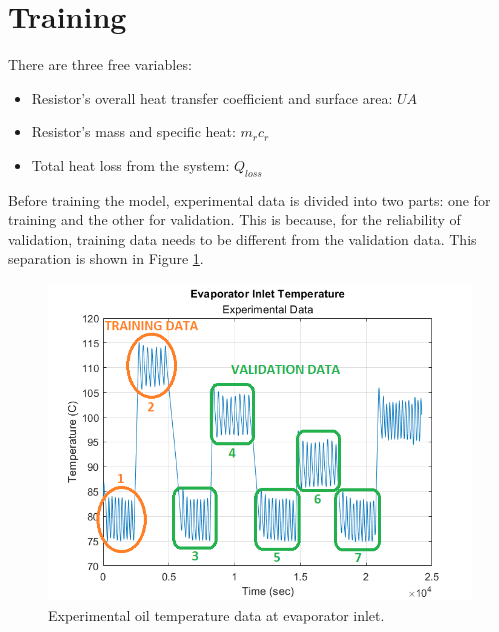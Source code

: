 \section{Training}\label{training}
There are three free variables:
\begin{itemize}
    \item Resistor's overall heat transfer coefficient and surface area: $UA$
    \item Resistor's mass and specific heat: $m_{r}c_{r}$
    \item Total heat loss from the system: $Q_{loss}$
\end{itemize}

Before training the model, experimental data is divided into two parts: one for training and the other for validation. This is because, for the reliability of validation, training data needs to be different from the validation data. This separation is shown in Figure \ref{fig:experimentaldata}.

\begin{figure}[h]
    \centering
    \includegraphics[width=13cm]{images/experimental-data.png}
    \caption{Experimental oil temperature data at evaporator inlet.}
    \label{fig:experimentaldata}
\end{figure}

